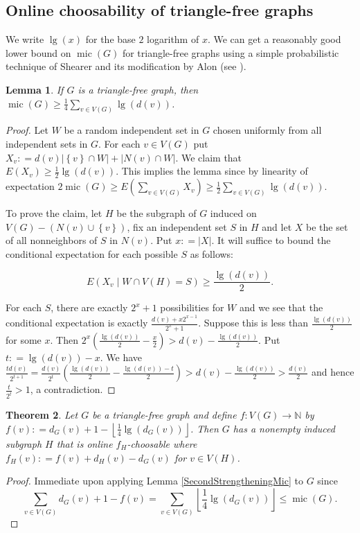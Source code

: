 \documentclass[12pt]{article}
\theoremstyle{plain}
\newtheorem{thm}{Theorem}[section]
\newtheorem{lem}[thm]{Lemma}
\theoremstyle{definition}
\theoremstyle{remark}
\newcommand{\IN}{\mathbb{N}}
\newcommand{\set}[1]{\left\{ #1 \right\}}
\newcommand{\card}[1]{\left|#1\right|}
\newcommand{\floor}[1]{\left\lfloor#1\right\rfloor}
\newcommand{\func}[3]{#1\colon #2 \rightarrow #3}
\newcommand{\parens}[1]{\left( #1 \right)}
\newcommand{\DefinedAs}{\mathrel{\mathop:}=}
\newcommand{\mic}{\operatorname{mic}}
\begin{document}
\subsection{Online choosability of triangle-free graphs}
We write $\lg(x)$ for the base $2$ logarithm of $x$.  We can get a reasonably good lower bound on $\mic(G)$ for triangle-free graphs using a simple probabilistic technique of Shearer and its modification by Alon (see \cite{alon2004probabilistic}).
\begin{lem}\label{triangle-free-mic}
If $G$ is a triangle-free graph, then $\mic(G) \ge \frac14 \sum_{v\in V(G)} \lg(d(v))$.
\end{lem}
\begin{proof}
Let $W$ be a random independent set in $G$ chosen uniformly from all independent sets in $G$.  For each $v \in V(G)$ put $X_v \DefinedAs d(v)\card{\set{v} \cap W} + \card{N(v) \cap W}$.
We claim that $E(X_v) \ge \frac12 \lg(d(v))$.  This implies the lemma since by linearity of expectation $2\mic(G) \ge E\parens{\sum_{v \in V(G)} X_v} \ge \frac12 \sum_{v\in V(G)} \lg(d(v))$.

To prove the claim, let $H$ be the subgraph of $G$ induced on $V(G) - \parens{N(v) \cup \set{v}}$, fix an independent set $S$ in $H$ and let $X$ be the set of all nonneighbors of $S$ in $N(v)$.  Put $x \DefinedAs |X|$.  It will suffice to bound the conditional expectation for each possible $S$ as follows:

\[E\parens{X_v \mid W \cap V(H) = S} \ge \frac{\lg(d(v))}{2}.\]

For each $S$, there are exactly $2^x + 1$ possibilities for $W$ and we see that the conditional expectation is exactly $\frac{d(v) + x2^{x-1}}{2^x + 1}$.  Suppose this is less than $\frac{\lg(d(v))}{2}$ for some $x$.
Then $2^x\parens{\frac{\lg(d(v))}{2} - \frac{x}{2}} > d(v) - \frac{\lg(d(v))}{2}$. Put $t \DefinedAs \lg(d(v)) - x$.  We have $\frac{td(v)}{2^{t+1}} = \frac{d(v)}{2^t}\parens{\frac{\lg(d(v))}{2} - \frac{\lg(d(v)) - t}{2}} > d(v) - \frac{\lg(d(v))}{2} > \frac{d(v)}{2}$ and hence $\frac{t}{2^t} > 1$, a contradiction.
\end{proof}

\begin{thm}\label{triangle-free-chooooser}
Let $G$ be a triangle-free graph and define $\func{f}{V(G)}{\IN}$ by $f(v) \DefinedAs d_G(v) + 1 - \floor{\frac14 \lg(d_G(v))}$.  Then $G$ has a nonempty induced subgraph $H$ that is online $f_H$-choosable where $f_H(v) \DefinedAs f(v) + d_H(v) - d_G(v)$ for $v \in V(H)$.
\end{thm}
\begin{proof}
Immediate upon applying Lemma \ref{SecondStrengtheningMic} to $G$ since 
\[\sum_{v \in V(G)} d_G(v) + 1 - f(v) = \sum_{v \in V(G)} \floor{\frac14 \lg(d_G(v))} \le \mic(G).\]
\end{proof}
\end{document}
